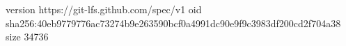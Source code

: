 version https://git-lfs.github.com/spec/v1
oid sha256:40eb9779776ac73274b9e263590bcf0a4991dc90e9f9c3983df200cd2f704a38
size 34736
